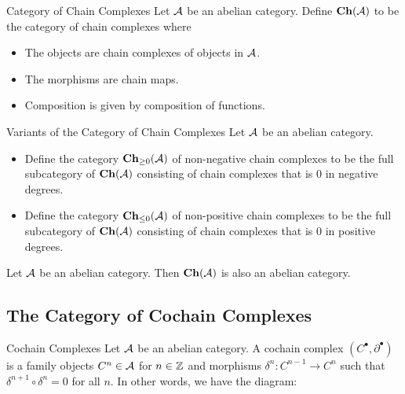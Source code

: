 \documentclass[a4paper]{article}
\begin{document}
\begin{defn}{Category of Chain Complexes}{} Let $\mathcal{A}$ be an abelian category. Define $\bold{Ch}(\mathcal{A})$ to be the category of chain complexes where 
\begin{itemize}
\item The objects are chain complexes of objects in $\mathcal{A}$. 
\item The morphisms are chain maps. 
\item Composition is given by composition of functions. 
\end{itemize}
\end{defn}

\begin{defn}{Variants of the Category of Chain Complexes}{} Let $\mathcal{A}$ be an abelian category. 
\begin{itemize}
\item Define the category $\bold{Ch}_{\geq 0}(\mathcal{A})$ of non-negative chain complexes to be the full subcategory of $\bold{Ch}(\mathcal{A})$ consisting of chain complexes that is $0$ in negative degrees. 
\item Define the category $\bold{Ch}_{\leq 0}(\mathcal{A})$ of non-positive chain complexes to be the full subcategory of $\bold{Ch}(\mathcal{A})$ consisting of chain complexes that is $0$ in positive degrees. 
\end{itemize}
\end{defn}

\begin{thm}{}{} Let $\mathcal{A}$ be an abelian category. Then $\bold{Ch}(\mathcal{A})$ is also an abelian category. 
\end{thm}

\subsection{The Category of Cochain Complexes}
\begin{defn}{Cochain Complexes}{} Let $\mathcal{A}$ be an abelian category. A cochain complex $(C^\bullet,\partial^\bullet)$ is a family objects $C^n\in\mathcal{A}$ for $n\in\mathbb{Z}$ and morphisms $\delta^n:C^{n-1}\to C^n$ such that $\delta^{n+1}\circ\delta^n=0$ for all $n$. In other words, we have the diagram: \\~\\
\end{defn}
\end{document}
